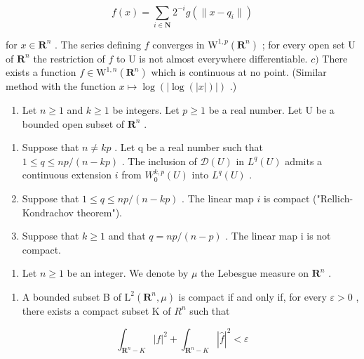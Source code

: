 \[
f (x) = \sum_ {i \in \mathbf {N}} 2 ^ {- i} g (\| x - q _ {i} \|)
\]

for \(x \in \mathbf{R}^n\) . The series defining \(f\) converges in \(\mathrm{W}^{1,p}(\mathbf{R}^n)\) ; for every open set U of \(\mathbf{R}^n\) the restriction of \(f\) to U is not almost everywhere differentiable. \(c)\) There exists a function \(f \in \mathrm{W}^{1,n}(\mathbf{R}^n)\) which is continuous at no point. (Similar method with the function \(x \mapsto \log(|\log(|x|)|)\) .)

\begin{enumerate}
\def\labelenumi{\arabic{enumi})}
\setcounter{enumi}{15}
\tightlist
\item
  Let \(n \geqslant 1\) and \(k \geqslant 1\) be integers. Let \(p \geqslant 1\) be a real number. Let U be a bounded open subset of \(\mathbf{R}^n\) .
\end{enumerate}

\begin{enumerate}
\def\labelenumi{\alph{enumi})}
\item
  Suppose that \(n \neq kp\) . Let q be a real number such that \(1 \leqslant q \leqslant np/(n-kp)\) . The inclusion of \(\mathcal{D}(U)\) in \(L^{q}(U)\) admits a continuous extension \(i\) from \(W_{0}^{k,p}(U)\) into \(L^{q}(U)\) .
\item
  Suppose that \(1 \leqslant q \leqslant np/(n-kp)\) . The linear map \(i\) is compact ("Rellich-Kondrachov theorem").
\item
  Suppose that \(k \geqslant 1\) and that \(q = np/(n - p)\) . The linear map i is not compact.
\end{enumerate}

\begin{enumerate}
\def\labelenumi{\arabic{enumi})}
\setcounter{enumi}{16}
\tightlist
\item
  Let \(n \geqslant 1\) be an integer. We denote by \(\mu\) the Lebesgue measure on \(\mathbf{R}^n\) .
\end{enumerate}

\begin{enumerate}
\def\labelenumi{\alph{enumi})}
\tightlist
\item
  A bounded subset B of \(\mathrm{L}^{2}(\mathbf{R}^{n},\mu)\) is compact if and only if, for every \(\varepsilon>0\) , there exists a compact subset K of \(R^{n}\) such that
\end{enumerate}

\[
\int_ {\mathbf {R} ^ {n} - K} | f | ^ {2} + \int_ {\mathbf {R} ^ {n} - K} | \widehat {f} | ^ {2} <   \varepsilon
\]

